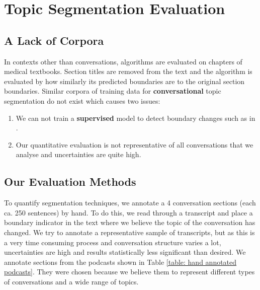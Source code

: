 \section{Topic Segmentation Evaluation}
\subsection{A Lack of Corpora}
    In contexts other than conversations, algorithms are evaluated on chapters of medical textbooks\cite{eisenstein2008bayesian, simon2013leveraging}. Section titles are removed from the text and the algorithm is evaluated by how similarly its predicted boundaries are to the original section boundaries.
    Similar corpora of training data for \textbf{conversational} topic segmentation do not exist which causes two issues:
    \begin{enumerate}
        \item We can not train a \textbf{supervised} \gls{model} to detect boundary changes such as in \cite{joty2013topic}.
        \item Our quantitative evaluation is not representative of all conversations that we analyse and uncertainties are quite high.
    \end{enumerate}

\subsection{Our Evaluation Methods \label{method: segmentation evaluation}}

        To quantify segmentation techniques, we annotate a 4 conversation sections (each ca. 250 sentences) by hand. To do this, we read through a transcript and place a boundary indicator in the text where we believe the topic of the conversation has changed. We try to annotate a representative sample of transcripts, but as this is a very time consuming process and conversation structure varies a lot, uncertainties are high and results statistically less significant than desired. We annotate sections from the podcasts shown in Table \ref{table: hand annotated podcasts}. They were chosen because we believe them to represent different types of conversations and a wide range of topics.

        \newcolumntype{B}{X}

